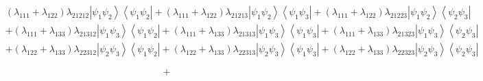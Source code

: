 \documentclass[aps,preprint]{revtex4}%
\begin{document}
\begin{align}
& \left(  \lambda_{111}+\lambda_{122}\right)  \lambda_{21212}\left\vert
\psi_{1}\psi_{2}\right\rangle \left\langle \psi_{1}\psi_{2}\right\vert
+\left(  \lambda_{111}+\lambda_{122}\right)  \lambda_{21213}\left\vert
\psi_{1}\psi_{2}\right\rangle \left\langle \psi_{1}\psi_{3}\right\vert
+\left(  \lambda_{111}+\lambda_{122}\right)  \lambda_{21223}\left\vert
\psi_{1}\psi_{2}\right\rangle \left\langle \psi_{2}\psi_{3}\right\vert
\nonumber\\
& +\left(  \lambda_{111}+\lambda_{133}\right)  \lambda_{21312}\left\vert
\psi_{1}\psi_{3}\right\rangle \left\langle \psi_{1}\psi_{2}\right\vert
+\left(  \lambda_{111}+\lambda_{133}\right)  \lambda_{21313}\left\vert
\psi_{1}\psi_{3}\right\rangle \left\langle \psi_{1}\psi_{3}\right\vert
+\left(  \lambda_{111}+\lambda_{133}\right)  \lambda_{21323}\left\vert
\psi_{1}\psi_{3}\right\rangle \left\langle \psi_{2}\psi_{3}\right\vert
\nonumber\\
& +\left(  \lambda_{122}+\lambda_{133}\right)  \lambda_{22312}\left\vert
\psi_{2}\psi_{3}\right\rangle \left\langle \psi_{1}\psi_{2}\right\vert
+\left(  \lambda_{122}+\lambda_{133}\right)  \lambda_{22313}\left\vert
\psi_{2}\psi_{3}\right\rangle \left\langle \psi_{1}\psi_{3}\right\vert
+\left(  \lambda_{122}+\lambda_{133}\right)  \lambda_{22323}\left\vert
\psi_{2}\psi_{3}\right\rangle \left\langle \psi_{2}\psi_{3}\right\vert
\end{align}
%

\[
+
\]
%
\end{document}
